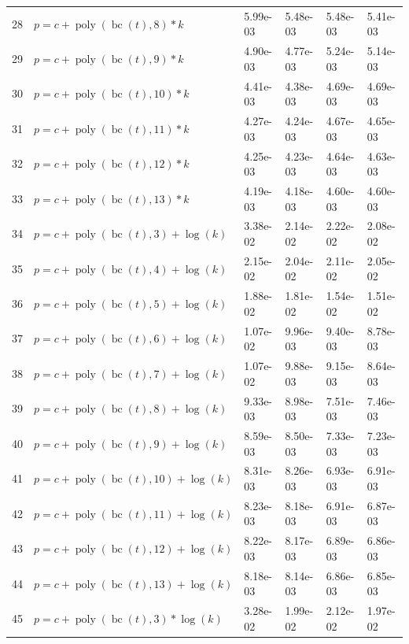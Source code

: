 \documentclass[12pt,a4paper]{article}
\DeclareMathOperator{\bc}{bc}
\DeclareMathOperator{\poly}{poly}
\begin{document}
\begin{longtable}[t]{ll>{\raggedleft\arraybackslash}p{2cm}>{\raggedleft\arraybackslash}p{2cm}>{\raggedleft\arraybackslash}p{2cm}>{\raggedleft\arraybackslash}p{2cm}}
28 & $p = c + \poly\left( \bc(t), 8 \right) * k$ & 5.99e-03 & 5.48e-03 & 5.48e-03 & 5.41e-03\\
\rowcolor{gray!6}  29 & $p = c + \poly\left( \bc(t), 9 \right) * k$ & 4.90e-03 & 4.77e-03 & 5.24e-03 & 5.14e-03\\
30 & $p = c + \poly\left( \bc(t), 10 \right) * k$ & 4.41e-03 & 4.38e-03 & 4.69e-03 & 4.69e-03\\
\rowcolor{gray!6}  31 & $p = c + \poly\left( \bc(t), 11 \right) * k$ & 4.27e-03 & 4.24e-03 & 4.67e-03 & 4.65e-03\\
32 & $p = c + \poly\left( \bc(t), 12 \right) * k$ & 4.25e-03 & 4.23e-03 & 4.64e-03 & 4.63e-03\\
\rowcolor{gray!6}  33 & $p = c + \poly\left( \bc(t), 13 \right) * k$ & 4.19e-03 & 4.18e-03 & 4.60e-03 & 4.60e-03\\
34 & $p = c + \poly\left( \bc(t), 3 \right) + \log(k)$ & 3.38e-02 & 2.14e-02 & 2.22e-02 & 2.08e-02\\
\rowcolor{gray!6}  35 & $p = c + \poly\left( \bc(t), 4 \right) + \log(k)$ & 2.15e-02 & 2.04e-02 & 2.11e-02 & 2.05e-02\\
36 & $p = c + \poly\left( \bc(t), 5 \right) + \log(k)$ & 1.88e-02 & 1.81e-02 & 1.54e-02 & 1.51e-02\\
\rowcolor{gray!6}  37 & $p = c + \poly\left( \bc(t), 6 \right) + \log(k)$ & 1.07e-02 & 9.96e-03 & 9.40e-03 & 8.78e-03\\
38 & $p = c + \poly\left( \bc(t), 7 \right) + \log(k)$ & 1.07e-02 & 9.88e-03 & 9.15e-03 & 8.64e-03\\
\rowcolor{gray!6}  39 & $p = c + \poly\left( \bc(t), 8 \right) + \log(k)$ & 9.33e-03 & 8.98e-03 & 7.51e-03 & 7.46e-03\\
40 & $p = c + \poly\left( \bc(t), 9 \right) + \log(k)$ & 8.59e-03 & 8.50e-03 & 7.33e-03 & 7.23e-03\\
\rowcolor{gray!6}  41 & $p = c + \poly\left( \bc(t), 10 \right) + \log(k)$ & 8.31e-03 & 8.26e-03 & 6.93e-03 & 6.91e-03\\
42 & $p = c + \poly\left( \bc(t), 11 \right) + \log(k)$ & 8.23e-03 & 8.18e-03 & 6.91e-03 & 6.87e-03\\
\rowcolor{gray!6}  43 & $p = c + \poly\left( \bc(t), 12 \right) + \log(k)$ & 8.22e-03 & 8.17e-03 & 6.89e-03 & 6.86e-03\\
44 & $p = c + \poly\left( \bc(t), 13 \right) + \log(k)$ & 8.18e-03 & 8.14e-03 & 6.86e-03 & 6.85e-03\\
\rowcolor{gray!6}  45 & $p = c + \poly\left( \bc(t), 3 \right) * \log(k)$ & 3.28e-02 & 1.99e-02 & 2.12e-02 & 1.97e-02\\

\end{longtable}
\end{document}
